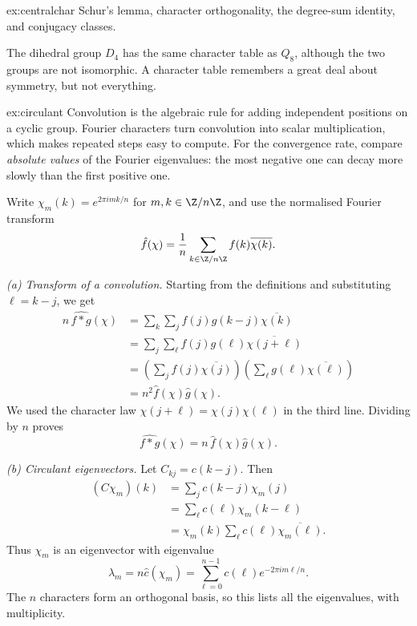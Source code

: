 \begin{solution}{ex:centralchar}
\tools Schur's lemma, character orthogonality, the degree-sum identity, and conjugacy classes.

\leads The dihedral group $D_4$ has the same character table as $Q_8$, although the two groups are not isomorphic. A character table remembers a great deal about symmetry, but not everything.
\end{solution}

\begin{solution}{ex:circulant}
\idea Convolution is the algebraic rule for adding independent positions on a cyclic group. Fourier characters turn convolution into scalar multiplication, which makes repeated steps easy to compute. For the convergence rate, compare \emph{absolute values} of the Fourier eigenvalues: the most negative one can decay more slowly than the first positive one.

\writeup Write $\chi_m(k)=e^{2\pi i mk/n}$ for $m,k\in\Z/n\Z$, and use the normalised Fourier transform
\[
\hat f(\chi)=\frac1n\sum_{k\in\Z/n\Z}f(k)\overline{\chi(k)}.
\]

\emph{(a) Transform of a convolution.} Starting from the definitions and substituting $\ell=k-j$, we get
\[
\begin{aligned}
n\,\widehat{f*g}(\chi)
&=\sum_k\sum_j f(j)g(k-j)\overline{\chi(k)}\\
&=\sum_j\sum_\ell f(j)g(\ell)\overline{\chi(j+\ell)}\\
&=\left(\sum_j f(j)\overline{\chi(j)}\right)
  \left(\sum_\ell g(\ell)\overline{\chi(\ell)}\right)\\
&=n^2\hat f(\chi)\hat g(\chi).
\end{aligned}
\]
We used the character law $\chi(j+\ell)=\chi(j)\chi(\ell)$ in the third line. Dividing by $n$ proves
\[
\boxed{\widehat{f*g}(\chi)=n\,\hat f(\chi)\hat g(\chi)}.
\]

\emph{(b) Circulant eigenvectors.} Let $C_{kj}=c(k-j)$. Then
\[
\begin{aligned}
(C\chi_m)(k)
&=\sum_jc(k-j)\chi_m(j)\\
&=\sum_\ell c(\ell)\chi_m(k-\ell)\\
&=\chi_m(k)\sum_\ell c(\ell)\overline{\chi_m(\ell)}.
\end{aligned}
\]
Thus $\chi_m$ is an eigenvector with eigenvalue
\[
\boxed{\lambda_m=n\hat c(\chi_m)
=\sum_{\ell=0}^{n-1}c(\ell)e^{-2\pi i m\ell/n}}.
\]
The $n$ characters form an orthogonal basis, so this lists all the eigenvalues, with multiplicity.


\end{solution}
